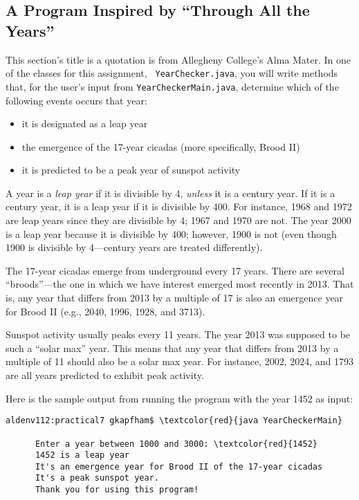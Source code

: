 \subsection*{A Program Inspired by ``Through All the Years''}
\vspace*{-.05in}

This section's title is a quotation is from Allegheny College's Alma Mater. In one of the classes for this assignment, {\tt
YearChecker.java}, you will write methods that, for the user's input from {\tt YearCheckerMain.java}, determine which of
the following events occurs that year: \begin{itemize}

\item
it is designated as a leap year

\item
the emergence of the 17-year cicadas (more specifically, Brood II)

\item
it is predicted to be a peak year of sunspot activity

\end{itemize}

\noindent A year is a {\em leap year} if it is divisible by 4, {\em unless} it is a century year. If it is a century
year, it is a leap year if it is divisible by 400. For instance, 1968 and 1972 are leap years since they are divisible
by 4; 1967 and 1970 are not.  The year 2000 is a leap year because it is divisible by 400; however, 1900 is not (even
though 1900 is divisible by 4---century years are treated differently).

\noindent The 17-year cicadas emerge from underground every 17 years. There are several ``broods''---the one in which we
have interest emerged most recently in 2013. That is, any year that differs from 2013 by a multiple of 17 is also an
emergence year for Brood II (e.g., 2040, 1996, 1928, and 3713).

\noindent Sunspot activity usually peaks every 11 years. The year 2013 was supposed to be such a ``solar max'' year.
This means that any year that differs from 2013 by a multiple of 11 should also be a solar max year. For instance, 2002,
2024, and 1793 are all years predicted to exhibit peak activity.

\noindent Here is the sample output from running the program with the year 1452 as input:

\begin{Verbatim}[commandchars=\\\{\}]
      aldenv112:practical7 gkapfham$ \textcolor{red}{java YearCheckerMain}

      Enter a year between 1000 and 3000: \textcolor{red}{1452}
      1452 is a leap year
      It's an emergence year for Brood II of the 17-year cicadas
      It's a peak sunspot year.
      Thank you for using this program!
\end{Verbatim}

